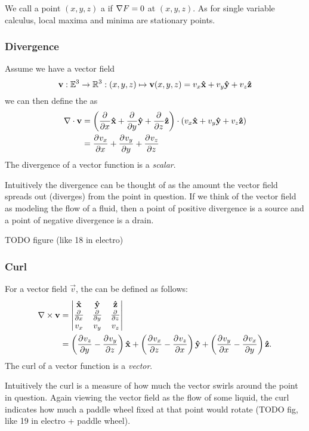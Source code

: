 We call a point $(x,y,z)$ a  if $\grad F = 0$ at $(x,y,z)$. As for single variable calculus, local maxima and minima are stationary points.

\subsubsection{Divergence}
Assume we have a vector field
\[ \vec{v}: \mathbb{E}^3 \to \mathbb{R}^3: (x,y,z) \mapsto \vec{v}(x,y,z) = v_x \vhat{x} + v_y \vhat{y} + v_z \vhat{z} \]
we can then define the  as
\begin{align*}
\nabla\cdot \vec{v} &= \left(\pd{}{x}\vhat{x} + \pd{}{y}\vhat{y} + \pd{}{z}\vhat{z}\right)\cdot (v_x \vhat{x} + v_y \vhat{y} + v_z \vhat{z}) \\
&= \pd{v_x}{x} + \pd{v_y}{y} + \pd{v_z}{z}
\end{align*}
The divergence of a vector function is a \textit{scalar}.

Intuitively the divergence can be thought of as the amount the vector field spreads out (diverges) from the point in question. If we think of the vector field as modeling the flow of a fluid, then a point of positive divergence is a source and a point of negative divergence is a drain.

TODO figure (like 18 in electro)

\subsubsection{Curl}
For a vector field $\vec{v}$, the  can be defined as follows:
\begin{align*}
\curl \vec{v} &= \begin{vmatrix}
\vhat{x} & \vhat{y} & \vhat{z} \\
\pd{}{x} & \pd{}{y} & \pd{}{z} \\
v_x & v_y & v_z
\end{vmatrix} \\
&= \left(\pd{v_z}{y} - \pd{v_y}{z}\right)\vhat{x} + \left(\pd{v_x}{z} - \pd{v_z}{x}\right)\vhat{y} + \left(\pd{v_y}{x} - \pd{v_x}{y}\right)\vhat{z}.
\end{align*}
The curl of a vector function is a \textit{vector}.

Intuitively the curl is a measure of how much the vector swirls around the point in question. Again viewing the vector field as the flow of some liquid, the curl indicates how much a paddle wheel fixed at that point would rotate (TODO fig, like 19 in electro + paddle wheel).

